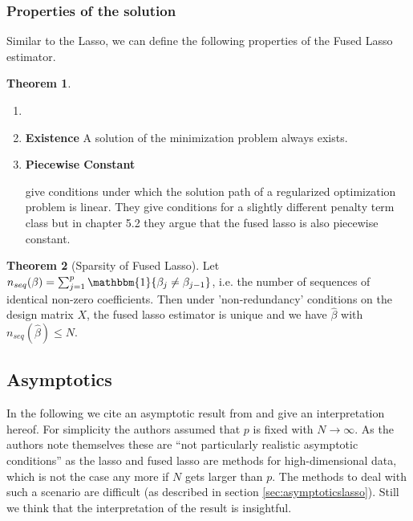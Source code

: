 \documentclass{article}
\theoremstyle{definition}
\newtheorem{theorem}{Theorem}
\begin{document}
\subsubsection{Properties of the solution}

Similar to the Lasso, we can define the following properties of the Fused Lasso estimator.

\begin{theorem}
	\begin{enumerate}
		\item[]
		\item \textbf{Existence} A solution of the minimization problem always exists.
		\item \textbf{Piecewise Constant}
		
\citet{rosset2007piecewise} give conditions under which the solution path of a regularized optimization problem is linear. They give conditions for a slightly different penalty term class but in chapter 5.2 they argue that the fused lasso is also piecewise constant.
	\end{enumerate}
\end{theorem}


\begin{theorem}[Sparsity of Fused Lasso] \citep{fused}
	Let $n_{seq}(\beta) = \sum_{j=1}^{p} \mathbbm{1} \{\beta_j \neq \beta_{j-1}\}$, i.e. the number of sequences of identical non-zero coefficients. Then under 'non-redundancy' conditions on the design matrix $X$, the fused lasso estimator is unique and we have $\hat{\beta}$ with $n_{seq}(\hat{\beta}) \leq N$.
\end{theorem}


\subsection{Asymptotics}

In the following we cite an asymptotic result from \citet{fused} and give an interpretation hereof.
For simplicity the authors assumed that $p$ is fixed with $N \rightarrow \infty$. As the authors note themselves these are ``not particularly realistic asymptotic conditions'' as the lasso and fused lasso are methods for high-dimensional data, which is not the case any more if $N$ gets larger than $p$. The methods to deal with such a scenario are difficult (as described in section \ref{sec:asymptoticslasso}). Still we think that the interpretation of the result is insightful.
\end{document}
